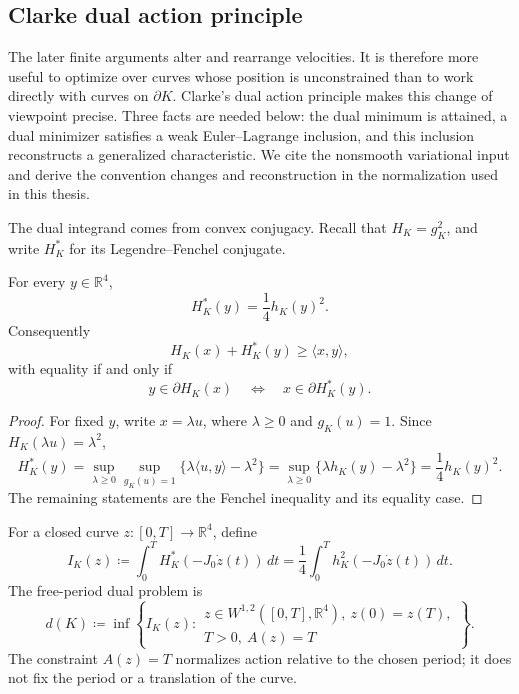 \subsection{Clarke dual action principle}
\label{subsec:preliminaries-clarke-dual-action-principle}

The later finite arguments alter and rearrange velocities.  It is therefore
more useful to optimize over curves whose position is unconstrained than to
work directly with curves on \(\partial K\).  Clarke's dual action principle
makes this change of viewpoint precise.  Three facts are needed below: the
dual minimum is attained, a dual minimizer satisfies a weak Euler--Lagrange
inclusion, and this inclusion reconstructs a generalized characteristic.  We
cite the nonsmooth variational input and derive the convention changes and
reconstruction in the normalization used in this thesis.

The dual integrand comes from convex conjugacy.  Recall that
\(H_K=g_K^2\), and write \(H_K^*\) for its Legendre--Fenchel conjugate.

\begin{lemma}
\label{lem:preliminaries-fenchel-duality}
For every \(y\in\mathbb R^4\),
\[
  H_K^*(y)=\frac14h_K(y)^2.
\]
Consequently
\[
  H_K(x)+H_K^*(y)\geq\langle x,y\rangle,
\]
with equality if and only if
\[
  y\in\partial H_K(x)
  \quad\Longleftrightarrow\quad
  x\in\partial H_K^*(y).
\]
\end{lemma}

\begin{proof}
For fixed \(y\), write \(x=\lambda u\), where \(\lambda\geq0\) and
\(g_K(u)=1\).  Since \(H_K(\lambda u)=\lambda^2\),
\[
  H_K^*(y)
  =\sup_{\lambda\geq0}\sup_{g_K(u)=1}
    \{\lambda\langle u,y\rangle-\lambda^2\}
  =\sup_{\lambda\geq0}\{\lambda h_K(y)-\lambda^2\}
  =\frac14h_K(y)^2.
\]
The remaining statements are the Fenchel inequality and its equality case.
\end{proof}

For a closed curve \(z\colon[0,T]\to\mathbb R^4\), define
\begin{equation}\label{eq:preliminaries-dual-functional}
  I_K(z)
  \coloneqq
  \int_0^T H_K^*(-J_0\dot z(t))\,dt
  =\frac14\int_0^T h_K^2(-J_0\dot z(t))\,dt.
\end{equation}
The free-period dual problem is
\begin{equation}\label{eq:preliminaries-dual-problem}
  d(K)\coloneqq
  \inf\left\{I_K(z):
    \begin{array}{l}
      z\in W^{1,2}([0,T],\mathbb R^4),\ z(0)=z(T),\\[-2pt]
      T>0,\ A(z)=T
    \end{array}
  \right\}.
\end{equation}
The constraint \(A(z)=T\) normalizes action relative to the chosen period; it
does not fix the period or a translation of the curve.

